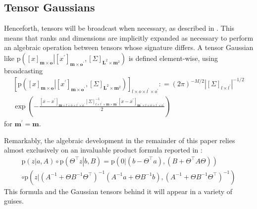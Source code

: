 \documentclass[preprint,12pt]{elsarticle}
\newcommand*{\M}[1]{\ensuremath{#1}\xspace}
\newcommand*{\tr}[1]{\M{#1}}
\newcommand*{\x}{\times}
\newcommand*{\mi}[1]{\mathbf{#1}}
\newcommand*{\te}[2][]{\left\lbrack{#2}\right\rbrack_{#1}}
\newcommand*{\prob}[3]{\M{\mathrm{p}\!\left(\left.{#1}\right\vert{#2,#3}\right)}}
\newcommand*{\deq}{\M{\mathrel{\mathop:}=}}
\newcommand*{\modulus}[1]{\M{\left\lvert{#1}\right\rvert}}
\begin{document}
    \subsection{Tensor Gaussians} \label{sub:GPR:Tensor}
        Henceforth, tensors will be broadcast when necessary, as described in \cite{Numpy2022,Harris2020}. This means that ranks and dimensions are implicitly expanded as necessary to perform an algebraic operation between tensors whose signature differs. A tensor Gaussian like $\prob{\te[\mi{m}\x\mi{o}]{x}}{\te[\mi{m}\x\mi{o^{\prime}}]{x^{\prime}}}
        {\te[\mi{L}^{2}\x\mi{m}^{2}]{\Sigma}}$ is defined element-wise, using broadcasting
        \begin{multline} \label{def:Notation:p}
            \te[l\x o \x l^{\prime}\x o^{\prime}]{\prob{\te[\mi{m}\x\mi{o}]{x}}{\te[\mi{m}\x\mi{o^{\prime}}]{x^{\prime}}}
            {\te[\mi{L}^{2}\x\mi{m}^{2}]{\Sigma}}}
            \deq (2 \pi)^{-M/2} \modulus{\te[l\x l^{\prime}]{\Sigma}}^{-1/2} \\
            \exp\left(-\frac{
                \te[\mi{m}\x l\x o\x l^{\prime}\x o^{\prime}]{x-x^{\prime}} 
            \te[l\x l^{\prime}\x\mi{m\x m^{\prime}}]{\Sigma}^{-1} 
            \te[\mi{m^{\prime}}\x l\x o\x l^{\prime}\x o^{\prime}]{x-x^{\prime}}}
            {2}\right)
        \end{multline}
        for $\mi{m^{\prime}} = \mi{m}$.

        Remarkably, the algebraic development in the remainder of this paper relies almost exclusively on an invaluable product formula reported in \cite{Rasmussen2016}:
        \begin{multline} \label{eq:GPR:product}
            \prob{z}{a}{A} \circ \prob{\Theta^{\intercal}z}{\tr{b}}{\tr{B}}
            = \prob{0}{(b-\Theta^{\intercal}a)}{(B + \Theta^{\intercal}A\Theta)} \\
            \circ \prob{z}
            {(A^{-1}+\Theta B^{-1}\Theta^{\intercal})^{-1}(A^{-1}a+\Theta B^{-1}b)}
            {(A^{-1}+\Theta B^{-1}\Theta^{\intercal})^{-1}}
        \end{multline}
        This formula and the Gaussian tensors behind it will appear in a variety of guises.
\end{document}
